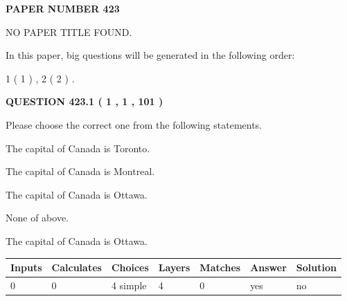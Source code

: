 \documentclass[12pt]{article}
\begin{document}
   
   
   
\newpage 
\setcounter{page}{ 
   423001 } 
   
   
   
   
 {\textbf{ \Large{ PAPER NUMBER  423  }}}
   
   
\vspace{0.2in}
   
   
   
   
   
   
 NO PAPER TITLE FOUND.
   
   
   
\vspace{0.2in}
   
In this paper, big questions will be generated in the following order: 
   
   
   1 ( 1 )
 ,
   2 ( 2 )
 .
  
\vspace{0.2in}
  
{\textbf{\Large{QUESTION
423.1 
 ( 1 , 1 , 101 )
}}}
  
  
Please choose the correct one from the following statements.
 
 
The capital of Canada is Toronto.
 
 
The capital of Canada is Montreal.
 
 
The capital of Canada is Ottawa.
 
 
 None of above.
 
 
\noindent{}
 
 
The capital of Canada is Ottawa.
 
 
\noindent{}
 
 
   
   
   
   
\noindent\begin{tabular}{|l|l|l|l|l|l|l|}
 \hline
Inputs & Calculates & Choices & Layers & Matches & Answer & Solution \\ \hline
 0  & 
 0  & 
 4
  simple  
  & 
 4  & 
 0  & 
  yes & 
  no 
  \\ \hline
 \end{tabular}
   
\end{document}
